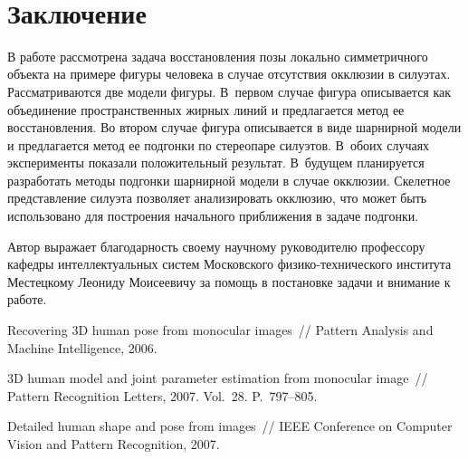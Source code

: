 \begin{multicols}{2}
\begin{figure*} %
\vspace*{1pt}
\begin{center}
\mbox{%
\epsfxsize=100.11mm
}
\end{center}
\vspace*{-6pt}
\end{figure*}
      
\section{Заключение}

     В работе рассмотрена задача восстановления позы локально 
симметричного объекта на примере фигуры человека в случае отсутствия 
окклюзии в силуэтах. Рассматриваются две модели фигуры. В~первом случае 
фигура описывается как объединение пространственных жирных линий и 
предлагается метод ее восстановления. Во втором случае фигура описывается в 
виде шарнирной модели и предлагается метод ее подгонки по стереопаре 
силуэтов. В~обоих случаях эксперименты показали положительный результат. 
В~будущем планируется разработать методы подгонки шарнирной модели в 
случае окклюзии. Скелетное представление силуэта позволяет анализировать 
окклюзию, что может быть использовано для построения начального 
приближения в задаче подгонки.
     
     \bigskip
     Автор выражает благодарность своему научному руководителю 
профессору кафедры интеллектуальных систем Московского 
     физико-технического института Местецкому Леониду Моисеевичу за 
помощь в постановке задачи и внимание к работе.

{\small\frenchspacing
{%
\begin{thebibliography}{99}

Recovering 3D human pose from monocular images~// Pattern Analysis and 
Machine Intelligence, 2006.

3D human model and joint parameter estimation from monocular image~// Pattern 
Recognition Letters, 2007. Vol.~28. P.~797--805.

Detailed human shape and pose from images~// IEEE Conference on Computer 
Vision and Pattern Recognition, 2007.
  

\end{thebibliography}}}
\end{multicols}
